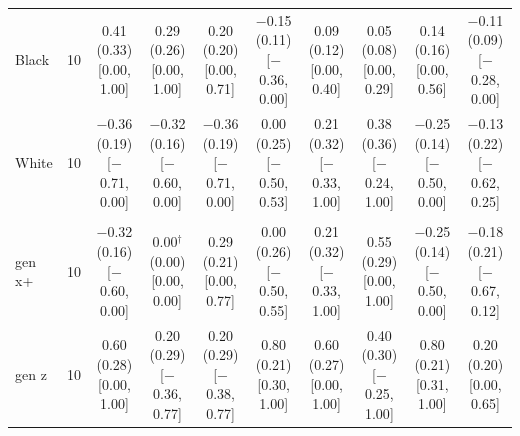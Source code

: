 \begin{table}[t]
\begin{tabular}{@{}lr*{8}{c}@{}}
\quad Black & 10 & \makecell{0.41 (0.33)\\ {[}0.00, 1.00{]}} & \makecell{0.29 (0.26)\\ {[}0.00, 1.00{]}} & \makecell{0.20 (0.20)\\ {[}0.00, 0.71{]}} & \makecell{$-$0.15 (0.11)\\ {[}$-$0.36, 0.00{]}} & \makecell{0.09 (0.12)\\ {[}0.00, 0.40{]}} & \makecell{0.05 (0.08)\\ {[}0.00, 0.29{]}} & \makecell{0.14 (0.16)\\ {[}0.00, 0.56{]}} & \makecell{$-$0.11 (0.09)\\ {[}$-$0.28, 0.00{]}} \\
\quad White & 10 & \makecell{$-$0.36 (0.19)\\ {[}$-$0.71, 0.00{]}} & \makecell{$-$0.32 (0.16)\\ {[}$-$0.60, 0.00{]}} & \makecell{$-$0.36 (0.19)\\ {[}$-$0.71, 0.00{]}} & \makecell{0.00 (0.25)\\ {[}$-$0.50, 0.53{]}} & \makecell{0.21 (0.32)\\ {[}$-$0.33, 1.00{]}} & \makecell{0.38 (0.36)\\ {[}$-$0.24, 1.00{]}} & \makecell{$-$0.25 (0.14)\\ {[}$-$0.50, 0.00{]}} & \makecell{$-$0.13 (0.22)\\ {[}$-$0.62, 0.25{]}} \\
\addlinespace
\multicolumn{10}{@{}l}{\textit{Age (D)}} \\
\quad gen x+ & 10 & \makecell{$-$0.32 (0.16)\\ {[}$-$0.60, 0.00{]}} & \makecell{0.00$^\dagger$ (0.00)\\ {[}0.00, 0.00{]}} & \makecell{0.29 (0.21)\\ {[}0.00, 0.77{]}} & \makecell{0.00 (0.26)\\ {[}$-$0.50, 0.55{]}} & \makecell{0.21 (0.32)\\ {[}$-$0.33, 1.00{]}} & \makecell{0.55 (0.29)\\ {[}0.00, 1.00{]}} & \makecell{$-$0.25 (0.14)\\ {[}$-$0.50, 0.00{]}} & \makecell{$-$0.18 (0.21)\\ {[}$-$0.67, 0.12{]}} \\
\quad gen z & 10 & \makecell{0.60 (0.28)\\ {[}0.00, 1.00{]}} & \makecell{0.20 (0.29)\\ {[}$-$0.36, 0.77{]}} & \makecell{0.20 (0.29)\\ {[}$-$0.38, 0.77{]}} & \makecell{0.80 (0.21)\\ {[}0.30, 1.00{]}} & \makecell{0.60 (0.27)\\ {[}0.00, 1.00{]}} & \makecell{0.40 (0.30)\\ {[}$-$0.25, 1.00{]}} & \makecell{0.80 (0.21)\\ {[}0.31, 1.00{]}} & \makecell{0.20 (0.20)\\ {[}0.00, 0.65{]}} \\

\end{tabular}
\end{table}
